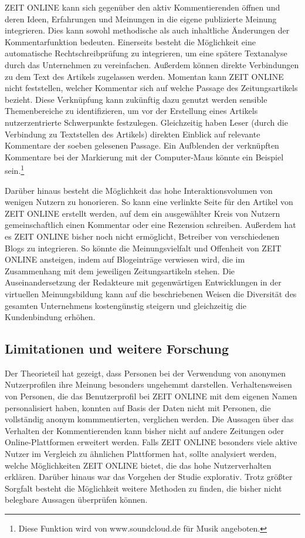 \documentclass[12pt,a4paper,oneside]{article}
\begin{document}
\begin{titlepage}
\begin{flushleft}
ZEIT ONLINE kann sich gegenüber den aktiv Kommentierenden öffnen und deren Ideen, Erfahrungen und Meinungen in die eigene publizierte Meinung integrieren. Dies kann sowohl methodische als auch inhaltliche Änder\-ungen der Kommentarfunktion bedeuten. Einerseits besteht die Möglichkeit eine automatische Rechtschreibprüfung zu integrieren, um eine spätere Textanalyse durch das Unternehmen zu vereinfachen. Außerdem können direkte Verbindungen zu dem Text des Artikels zugelassen werden. Momentan kann ZEIT ONLINE nicht feststellen, welcher Kommentar sich auf welche Passage des Zeitungsartikels bezieht. Diese Verknüpfung kann zukünftig dazu genutzt werden sensible Themenbereiche zu identifizieren, um vor der Erstellung eines Artikels nutzerzentrierte Schwerpunkte festzulegen. Gleichzeitig haben Leser (durch die Verbindung zu Textstellen des Artikels) direkten Einblick auf relevante Kommentare der soeben gelesenen Passage. Ein Aufblenden der verknüpften Kommentare bei der Markierung mit der Computer-Maus könnte ein Beispiel sein.\footnote{Diese Funktion wird von www.soundcloud.de für Musik angeboten.}

Darüber hinaus besteht die Möglichkeit das hohe Interaktionsvolumen von wenigen Nutzern zu honorieren. So kann eine verlinkte Seite für den Artikel von ZEIT ONLINE erstellt werden, auf dem ein ausgewählter Kreis von Nutzern gemeinschaftlich einen Kommentar oder eine Rezension schreiben. Außerdem hat es ZEIT ONLINE bisher noch nicht ermöglicht, Betreiber von verschiedenen Blogs zu integrieren. So könnte die Meinungsvielfalt und Offenheit von ZEIT ONLINE ansteigen, indem auf Blogeinträge verwiesen wird, die im Zusammenhang mit dem jeweiligen Zeitungsartikeln stehen. Die Auseinandersetzung der Redakteure mit gegenwärtigen Entwicklungen in der virtuellen Meinungsbildung kann auf die beschriebenen Weisen die Diversität des gesamten Unternehmens kostengünstig steigern und gleichzeitig die Kundenbindung erhöhen.

\subsection{Limitationen und weitere Forschung}
Der Theorieteil hat gezeigt, dass Personen bei der Verwendung von anonymen Nutzerprofilen ihre Meinung besonders ungehemmt darstellen. Verhaltensweisen von Personen, die das Benutzerprofil bei ZEIT ONLINE mit dem eigenen Namen personalisiert haben, konnten auf Basis der Daten nicht mit Personen, die vollständig anonym kommmentierten, verglichen werden. Die Aussagen über das Verhalten der Kommentierenden kann bisher nicht auf andere Zeitungen oder Online-Plattformen erweitert werden. Falls ZEIT ONLINE\- besonders viele aktive Nutzer im Vergleich zu ähnlichen Plattformen hat, sollte analysiert werden, welche Möglichkeiten ZEIT ONLINE bietet, die das hohe Nutzerverhalten erklären. Darüber hinaus war das Vorgehen der Studie explorativ. Trotz größter Sorgfalt besteht die Möglichkeit weitere Methoden zu finden, die bisher nicht belegbare Aussagen überprüfen können.


\end{flushleft}
\end{titlepage}
\end{document}
